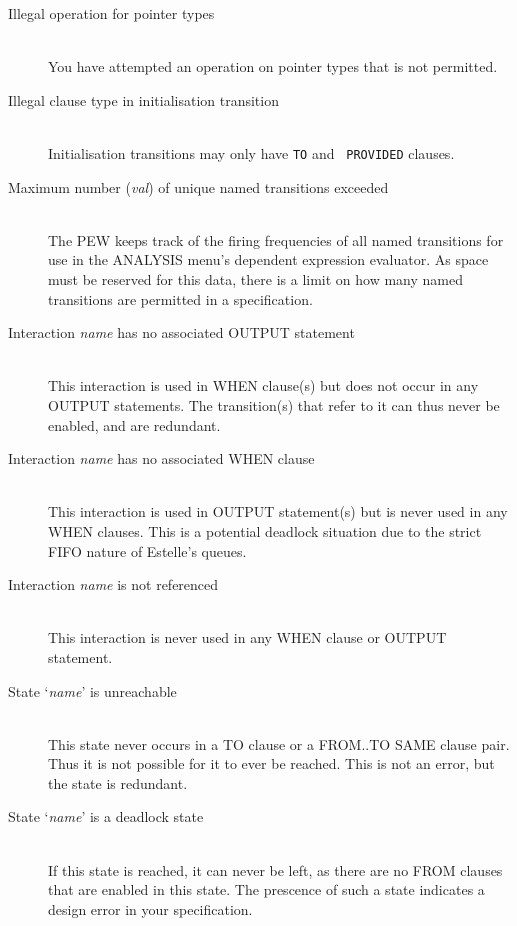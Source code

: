 \begin{description}
\item[Illegal operation for pointer types]\mbox{}\\
You have attempted an operation on pointer types that is not
permitted.

\item[Illegal clause type in initialisation transition]\mbox{}\\
Initialisation transitions may only have {\tt TO} and {\tt
PROVIDED} clauses.

\item[Maximum number ({\em val}) of unique named transitions exceeded]\mbox{}\\
The PEW keeps track of the firing frequencies of all named transitions
for use in the ANALYSIS menu's dependent expression evaluator. As
space must be reserved for this data, there is a limit on how many named
transitions are permitted in a specification.

\item[Interaction {\em name} has no associated OUTPUT statement]\mbox{}\\
This interaction is used in WHEN clause(s) but does not occur in
any OUTPUT statements. The transition(s) that refer to it can thus
never be enabled, and are redundant.

\item[Interaction {\em name} has no associated WHEN clause]\mbox{}\\
This interaction is used in OUTPUT statement(s) but is never used
in any WHEN clauses. This is a potential deadlock situation due
to the strict FIFO nature of Estelle's queues.

\item[Interaction {\em name} is not referenced]\mbox{}\\
This interaction is never used in any WHEN clause or OUTPUT statement.

\item[State `{\em name}' is unreachable]\mbox{}\\
This state never occurs in a TO clause or a FROM..TO SAME clause pair.
Thus it is not possible for it to ever be reached. This is not an error,
but the state is redundant.

\item[State `{\em name}' is a deadlock state]\mbox{}\\
If this state is reached, it can never be left, as there are no FROM
clauses that are enabled in this state. The prescence of such a
state indicates a design error in your specification.


\end{description}
